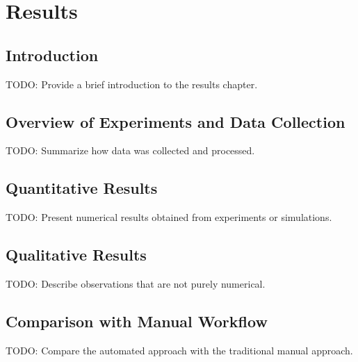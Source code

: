 \chapter{Results}
\label{sec:results}


\section{Introduction}
TODO: Provide a brief introduction to the results chapter.

\section{Overview of Experiments and Data Collection}
TODO: Summarize how data was collected and processed.

\section{Quantitative Results}
TODO: Present numerical results obtained from experiments or simulations.

\section{Qualitative Results}
TODO: Describe observations that are not purely numerical.

\section{Comparison with Manual Workflow}
TODO: Compare the automated approach with the traditional manual approach.

